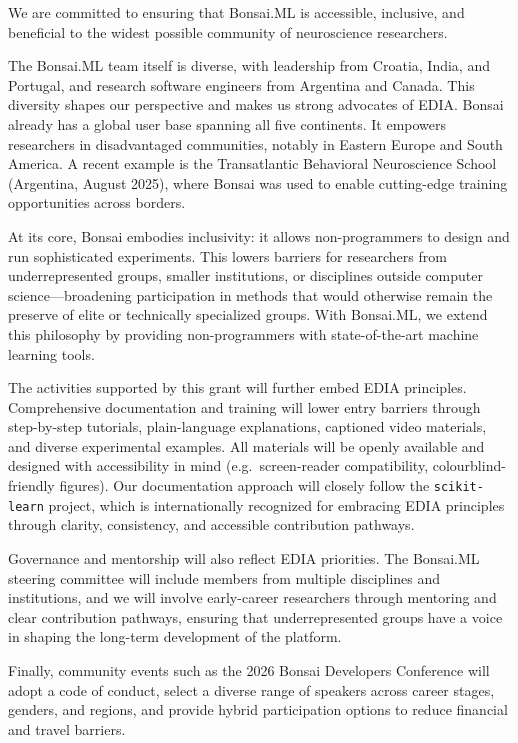 We are committed to ensuring that Bonsai.ML is accessible, inclusive, and 
beneficial to the widest possible community of neuroscience researchers.

The Bonsai.ML team itself is diverse, with leadership from Croatia, India, 
and Portugal, and research software engineers from Argentina and Canada. 
This diversity shapes our perspective and makes us strong advocates of EDIA. 
Bonsai already has a global user base spanning all five continents. It 
empowers researchers in disadvantaged communities, notably in Eastern Europe 
and South America. A recent example is the Transatlantic Behavioral 
Neuroscience School (Argentina, August 2025), where Bonsai was used to enable 
cutting-edge training opportunities across borders.

At its core, Bonsai embodies inclusivity: it allows non-programmers to design 
and run sophisticated experiments. This lowers barriers for researchers from 
underrepresented groups, smaller institutions, or disciplines outside computer 
science---broadening participation in methods that would otherwise remain the 
preserve of elite or technically specialized groups. With Bonsai.ML, we extend 
this philosophy by providing non-programmers with state-of-the-art machine 
learning tools.

The activities supported by this grant will further embed EDIA principles. 
Comprehensive documentation and training will lower entry barriers through 
step-by-step tutorials, plain-language explanations, captioned video materials, 
and diverse experimental examples. All materials will be openly available and 
designed with accessibility in mind (e.g.\ screen-reader compatibility, 
colourblind-friendly figures). Our documentation approach will closely follow 
the \texttt{scikit-learn} project, which is internationally recognized for 
embracing EDIA principles through clarity, consistency, and accessible 
contribution pathways.

Governance and mentorship will also reflect EDIA priorities. The Bonsai.ML 
steering committee will include members from multiple disciplines and
institutions, 
and we will involve early-career researchers through mentoring and clear 
contribution pathways, ensuring that underrepresented groups have a voice in 
shaping the long-term development of the platform.

Finally, community events such as the 2026 Bonsai Developers Conference will 
adopt a code of conduct, select a diverse range of speakers across career 
stages, genders, and regions, and provide hybrid participation options to
reduce 
financial and travel barriers.

